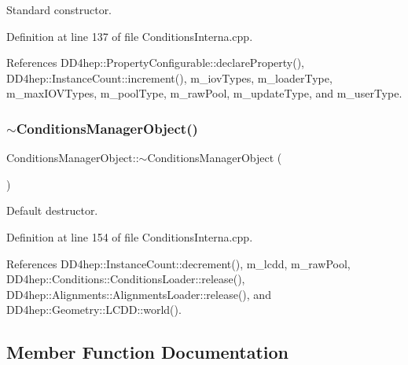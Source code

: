 Standard constructor. 



Definition at line 137 of file Conditions\+Interna.\+cpp.



References D\+D4hep\+::\+Property\+Configurable\+::declare\+Property(), D\+D4hep\+::\+Instance\+Count\+::increment(), m\+\_\+iov\+Types, m\+\_\+loader\+Type, m\+\_\+max\+I\+O\+V\+Types, m\+\_\+pool\+Type, m\+\_\+raw\+Pool, m\+\_\+update\+Type, and m\+\_\+user\+Type.

\hypertarget{class_d_d4hep_1_1_conditions_1_1_conditions_manager_object_a78747f9367ce2e43b3d0ee4214eb9ab3}{}\label{class_d_d4hep_1_1_conditions_1_1_conditions_manager_object_a78747f9367ce2e43b3d0ee4214eb9ab3} 
\subsubsection{\texorpdfstring{$\sim$\+Conditions\+Manager\+Object()}{~ConditionsManagerObject()}}
{\footnotesize\ttfamily Conditions\+Manager\+Object\+::$\sim$\+Conditions\+Manager\+Object (\begin{DoxyParamCaption}{ }\end{DoxyParamCaption})\hspace{0.3cm}{\ttfamily [virtual]}}



Default destructor. 



Definition at line 154 of file Conditions\+Interna.\+cpp.



References D\+D4hep\+::\+Instance\+Count\+::decrement(), m\+\_\+lcdd, m\+\_\+raw\+Pool, D\+D4hep\+::\+Conditions\+::\+Conditions\+Loader\+::release(), D\+D4hep\+::\+Alignments\+::\+Alignments\+Loader\+::release(), and D\+D4hep\+::\+Geometry\+::\+L\+C\+D\+D\+::world().



\subsection{Member Function Documentation}
\hypertarget{class_d_d4hep_1_1_conditions_1_1_conditions_manager_object_a4e7c5a6f766e182c7fcdcf766c28f9a0}{}\label{class_d_d4hep_1_1_conditions_1_1_conditions_manager_object_a4e7c5a6f766e182c7fcdcf766c28f9a0} 
